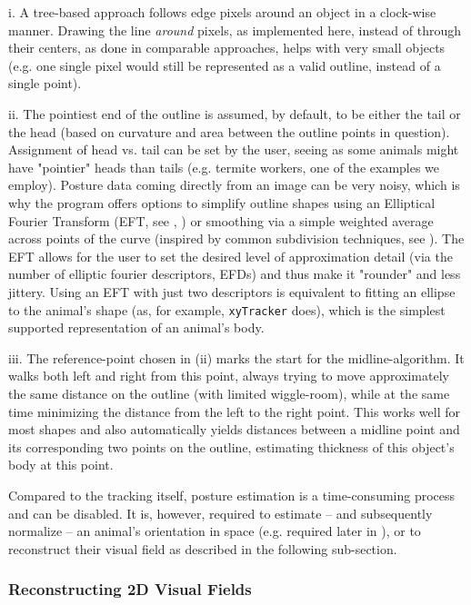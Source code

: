 \documentclass[9pt,lineno]{elife}
\begin{document}
i. A tree-based approach follows edge pixels around an object in a clock-wise manner. Drawing the line \emph{around} pixels, as implemented here, instead of through their centers, as done in comparable approaches, helps with very small objects (e.g. one single pixel would still be represented as a valid outline, instead of a single point).

ii. The pointiest end of the outline is assumed, by default, to be either the tail or the head (based on curvature and area between the outline points in question). Assignment of head vs. tail can be set by the user, seeing as some animals might have "pointier" heads than tails (e.g. termite workers, one of the examples we employ). Posture data coming directly from an image can be very noisy, which is why the program offers options to simplify outline shapes using an Elliptical Fourier Transform (EFT, see \citealt{iwata2015genomic}, \citealt{kuhl1982elliptic}) or smoothing via a simple weighted average across points of the curve (inspired by common subdivision techniques, see \citealt{warren2001subdivision}). The EFT allows for the user to set the desired level of approximation detail (via the number of elliptic fourier descriptors, EFDs) and thus make it "rounder" and less jittery. Using an EFT with just two descriptors is equivalent to fitting an ellipse to the animal's shape (as, for example, \verb!xyTracker! does), which is the simplest supported representation of an animal's body.

iii. The reference-point chosen in (ii) marks the start for the midline-algorithm. It walks both left and right from this point, always trying to move approximately the same distance on the outline (with limited wiggle-room), while at the same time minimizing the distance from the left to the right point. This works well for most shapes and also automatically yields distances between a midline point and its corresponding two points on the outline, estimating thickness of this object's body at this point.

Compared to the tracking itself, posture estimation is a time-consuming process and can be disabled. It is, however, required to estimate -- and subsequently normalize -- an animal's orientation in space (e.g. required later in ), or to reconstruct their visual field as described in the following sub-section.

\subsubsection{Reconstructing 2D Visual Fields}
\end{document}
